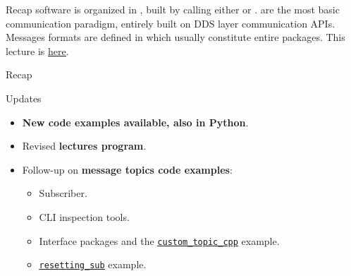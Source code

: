 
\begin{frame}{Recap}
 software is organized in , built by  calling either  or .
\newline\newline
{} are the most basic communication paradigm, entirely built on DDS layer communication APIs.
\newline\newline
Messages formats are defined in  which usually constitute entire packages.
\newline\newline
This lecture is \href{https://github.com/robmasocco/DAFN23_Robotics_3}{\color{blue}\underline{here}}.
\end{frame}
\begin{frame}{Recap}
  \begin{block}{Updates}
    \begin{itemize}
      \item \textbf{New code examples available, also in Python}.
      \item Revised \textbf{lectures program}.
      \item Follow-up on \textbf{message topics code examples}:
      \begin{itemize}
        \item Subscriber.
        \item CLI inspection tools.
        \item Interface packages and the \href{https://github.com/IntelligentSystemsLabUTV/ros2-examples/tree/humble/src/cpp/custom_topic_cpp}{\color{blue}\underline{\texttt{custom\_topic\_cpp}}} example.
        \item \href{https://github.com/IntelligentSystemsLabUTV/ros2-examples/blob/humble/src/cpp/topic_pubsub_cpp/src/resetting_sub.cpp}{\color{blue}\underline{\texttt{resetting\_sub}}} example.
      \end{itemize}
    \end{itemize}
  \end{block}
\end{frame}
